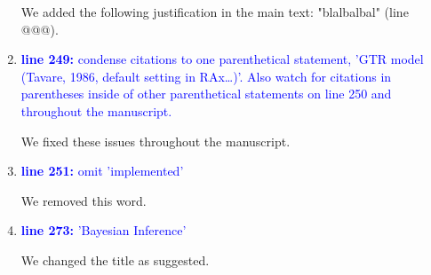 \documentclass[12pt,letterpaper]{article}
\begin{document}
\begin{enumerate}
We added the following justification in the main text:
"blalbalbal" (line @@@).




\item{\textcolor{blue}{\textbf{line 249:} condense citations to one parenthetical statement, 'GTR model (Tavare, 1986, default setting in RAx…)'. Also watch for citations in parentheses inside of other parenthetical statements on line 250 and throughout the manuscript. }}

We fixed these issues throughout the manuscript.

\item{\textcolor{blue}{\textbf{line 251:} omit 'implemented'}}

We removed this word.

\item{\textcolor{blue}{\textbf{line 273:} 'Bayesian Inference'}}

We changed the title as suggested.


\end{enumerate}
\end{document}
